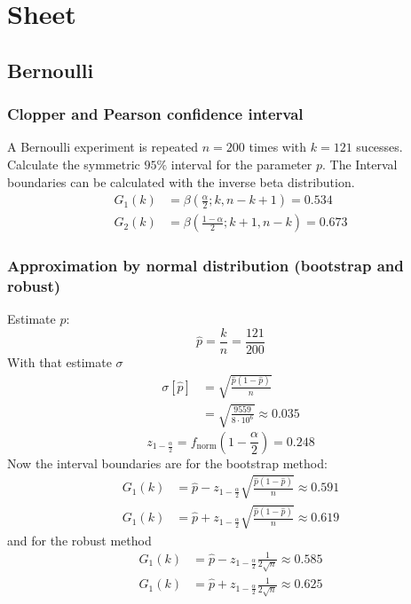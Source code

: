 \section{Sheet}
\subsection{Bernoulli}
\subsubsection{Clopper and Pearson confidence interval}
A Bernoulli experiment is repeated $n=200$ times with $k=121$ sucesses. Calculate the symmetric $95\%$ interval
for the  parameter $p$.
The Interval boundaries can be calculated with the inverse beta distribution.
\begin{align}
    G_1\left(k\right)&=\beta\left(\frac{\alpha}{2};k,n-k+1\right)=0.534
    \\G_2\left(k\right)&=\beta\left(\frac{1-\alpha}{2};k+1,n-k\right)=0.673
\end{align}
\subsubsection{Approximation by normal distribution (bootstrap and robust)}
Estimate $p$:
\begin{equation}
    \hat{p}=\frac{k}{n}=\frac{121}{200}
\end{equation}
With that estimate $\sigma$
\begin{align}
    \sigma\left[\hat{p}\right]&=\sqrt{\frac{\hat{p}\left(1-\hat{p}\right)}{n}}
    \\&=\sqrt{\frac{9559}{8\cdot 10^6}}\approx 0.035
\end{align}
\begin{equation}
    z_{1-\frac{\alpha}{2}}=f_{\text{norm}}\left(1-\frac{\alpha}{2}\right)=0.248
\end{equation}
Now the interval boundaries are for the bootstrap method:
\begin{align}
    G_1\left(k\right)&=\hat{p}-z_{1-\frac{\alpha}{2}}\sqrt{\frac{\hat{p}\left(1-\hat{p}\right)}{n}}\approx 0.591
    \\G_1\left(k\right)&=\hat{p}+z_{1-\frac{\alpha}{2}}\sqrt{\frac{\hat{p}\left(1-\hat{p}\right)}{n}}\approx 0.619
\end{align}
and for the robust method
\begin{align}
    G_1\left(k\right)&=\hat{p}-z_{1-\frac{\alpha}{2}}\frac{1}{2\sqrt{n}}\approx 0.585
    \\G_1\left(k\right)&=\hat{p}+z_{1-\frac{\alpha}{2}}\frac{1}{2\sqrt{n}}\approx 0.625
\end{align}
